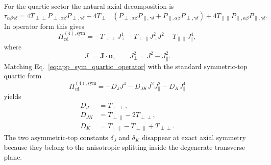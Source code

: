 \documentclass[journal=jacsat,manuscript=article]{achemso}
\begin{document}
For the quartic sector the natural axial decomposition is
\begin{equation}
\tau_{\alpha\beta\gamma\delta}
=
4T_{\perp\perp}
P_{\perp,\alpha\beta}P_{\perp,\gamma\delta}
+ 4T_{\perp\parallel}
\left(
P_{\perp,\alpha\beta}P_{\parallel,\gamma\delta}
+
P_{\parallel,\alpha\beta}P_{\perp,\gamma\delta}
\right)
+ 4T_{\parallel\parallel}
P_{\parallel,\alpha\beta}P_{\parallel,\gamma\delta}.
\label{eq:app_sym_tau_decomp}
\end{equation}
In operator form this gives
\begin{equation}
H_{\mathrm{cd}}^{(4),\mathrm{sym}}
=
-T_{\perp\perp} J_{\perp}^4
-T_{\perp\parallel} J_{\perp}^2 J_{\parallel}^2
-T_{\parallel\parallel} J_{\parallel}^4,
\label{eq:app_sym_quartic_operator}
\end{equation}
where
\begin{equation}
J_{\parallel} = \mathbf J\!\cdot\!\mathbf u,
\qquad
J_{\perp}^2 = J^2 - J_{\parallel}^2.
\end{equation}
Matching Eq.~\eqref{eq:app_sym_quartic_operator} with the standard
symmetric-top quartic form
\begin{equation}
H_{\mathrm{cd}}^{(4),\mathrm{sym}}
=
-D_J J^4
-D_{JK} J^2 J_{\parallel}^2
-D_K J_{\parallel}^4
\end{equation}
yields
\begin{align}
D_J &= T_{\perp\perp}, \\
D_{JK} &= T_{\perp\parallel} - 2T_{\perp\perp}, \\
D_K &= T_{\parallel\parallel} - T_{\perp\parallel} + T_{\perp\perp}.
\label{eq:app_sym_quartic_constants}
\end{align}
The two asymmetric-top constants $\delta_J$ and $\delta_K$ disappear at exact
axial symmetry because they belong to the anisotropic splitting inside the
degenerate transverse plane.
\end{document}
